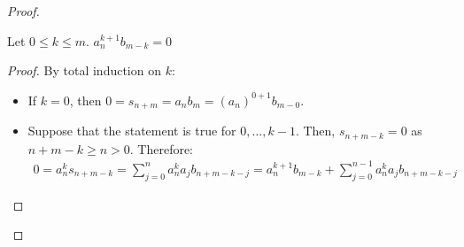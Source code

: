 \begin{problem}
\begin{enumerate}[label=(\theproblem.\arabic*),ref=\theproblem.\arabic*]
\begin{sol}
\begin{proof}
\begin{itemize}
                        \begin{claim}
                            Let $0 \leq k \leq m$. $a_n^{k + 1} b_{m-k} = 0$
                            \begin{proof}
                                By total induction on $k$:
                                \begin{itemize}
                                    \item If $k = 0$, then $0 = s_{n+m} = a_n b_m = (a_n)^{0+1}b_{m-0}$.
                                    \item Suppose that the statement is true for $0, \ldots, k-1$.
                                    Then, $s_{n+m-k} = 0$ as $n+m-k \geq n > 0$.
                                    Therefore:
                                        \begin{align*}
                                            0 = a_n^k s_{n+m-k} = \sum_{j=0}^{n} a_n^k a_j b_{n+m-k-j} = a_n^{k+1} b_{m-k} + \sum_{j=0}^{n-1} a_n^k a_j b_{n+m-k-j}
                                        \end{align*}


\end{itemize}
\end{proof}
\end{claim}
\end{itemize}
\end{proof}
\end{sol}
\end{enumerate}
\end{problem}
